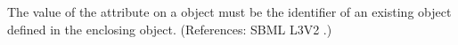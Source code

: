 The value of the attribute  on a \Species object
must be the identifier of an existing \Parameter object defined in the
enclosing \Model object.  (References: SBML L3V2
.)
